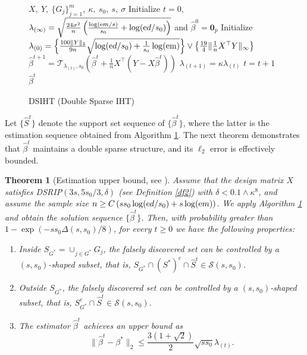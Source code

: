 \documentclass[12pt]{article}
\newtheorem{theorem}{Theorem}
\begin{document}
\begin{figure}
\begin{algorithm}[H]
\caption{DSIHT (Double Sparse IHT)}\label{IHT} %
\begin{algorithmic}[1]
    \REQUIRE $X,\ Y,\ \{G_j\}^m_{j=1},\ \kappa,\ s_0,\ s,\ \sigma$
    \STATE Initialize $t=0$, $\lambda_{(\infty)} =  \sqrt{ \frac{24 \sigma^2}n \left( \frac{\log({\rm e} m /s)}{s_0}+ \log({\rm e} d/s_0) \right) }$ and $\hat \beta^0 = \mathbf 0_p$ 
    \STATE Initialize $\lambda_{(0)} = \left\{ \frac{100 \| Y\|_2}{9n}\sqrt{ \log({\rm e} d/s_0)+\frac{1}{s_0}\log(\rm em)  } \right\}\vee \left\{ \frac{19}{4}\|\frac1n X^\top Y \|_{\infty} \right\}$
    \STATE ${\hat \beta}^{t+1} = \mathcal{T}_{\lambda_{(t)}, s_0}\left({\hat \beta}^{t} + \frac1n X^\top(Y-X{\hat \beta}^{t})\right)$
    \STATE $\lambda_{(t+1)} = \kappa \lambda_{(t)}$
    \STATE $t = t+1$
    \ENDWHILE
    \ENSURE $\hat \beta^{t}$
  \end{algorithmic}
\end{algorithm}
\end{figure}

Let $\{\hat S^t\}$ denote the support set sequence of $\{\hat \beta^t\}$, where the latter is the estimation sequence obtained from Algorithm \ref{IHT}. 
The next theorem %
demonstrates that $\hat \beta^t$ maintains a double sparse structure, and its $\ell_2$ error is effectively bounded.

\begin{theorem}[Estimation upper bound, see \cite{ZL23}]\label{upperbound}
    Assume that the design matrix $X$ satisfies DSRIP$(3s, 5 s_0/3, \delta )$ (see Definition \ref{df2}) with $\delta <0.1 \wedge\kappa^8$, and assume the sample size $ n \ge C\left( ss_0 \log({\rm e} d/s_0) +s \log({\rm e} m )\right)$.
    We apply Algorithm \ref{IHT} and obtain the solution sequence $\{\hat \beta^t \}$.
    Then, with probability greater than $1-\exp\left(-  ss_0\Delta(s,s_0)/8 \right)$, for every $ t \ge 0$ we have the following properties:
    \begin{enumerate}
        \item Inside $S_{G^*} = \cup_{j \in G^*} G_j$, the falsely discovered set can be controlled by a $(s, s_0)$-shaped subset, that is, $S_{G^*} \cap (S^*)^c \cap \hat S^t \in \mathcal S(s,s_0)$.
        \item Outside $S_{G^*}$, the falsely discovered set can be controlled by a $(s, s_0)$-shaped subset, that is, $S_{G^*}^c \cap \hat S^t \in \mathcal S(s,s_0)$.
        \item The estimator $\hat \beta^t$ achieves an upper bound as 
        $$
        \|\hat \beta^{t} - \beta^* \|_2  \le \frac{3(1+ \sqrt{2})}2 \sqrt{ss_0} \lambda_{(t)} .
        $$
    \end{enumerate}
\end{theorem}
\end{document}
